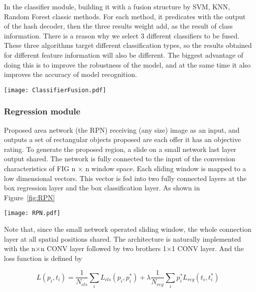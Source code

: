 In the classifier module, building it with
a fusion structure by SVM, KNN, Random
Forest classic methods. For each method, it 
predicates with the output of the hash decoder,
then the three results weight add, as the 
result of class information. There is a reason
why we select 3 different classifiers to be 
fused. These three algorithms target 
different classification types, so the 
results obtained for different feature 
information will also be different. The 
biggest advantage of doing this is to 
improve the robustness of the model, 
and at the same time it also improves 
the accuracy of model recognition. 

\begin{figure*}[!ht]
    \centering
    \texttt{[image: ClassifierFusion.pdf]}
    \caption{The module of the fusion of 
        classifier.}
    \label{fig:classifierFusion}
\end{figure*}   

\subsubsection{Regression module}
\label{sec:MethNetReg}

Proposed area network (the RPN) receiving 
(any size) image as an input, and outputs a 
set of rectangular objects proposed are each 
offer it has an objective rating.
To generate the proposed region, a slide on 
a small network last layer output shared.
The network is fully connected to the input 
of the conversion characteristics of FIG 
n × n window space.
Each sliding window is mapped to a low 
dimensional vectors.
This vector is fed into two fully connected 
layers at the box regression 
layer and the box classification layer.
As shown in Figure~\ref{fig:RPN}

\begin{figure*}[!ht]
    \centering
    \texttt{[image: RPN.pdf]}
    \caption{The module of the region proposal 
        network.}
    \label{fig:RPN}
\end{figure*} 


Note that, since the small network operated 
sliding window, the whole connection layer at 
all spatial positions shared. 
The architecture is naturally implemented with 
the n×n CONV layer followed by two brothers 
1×1 CONV layer\cite{Ren2017}.
And the loss function is defined by

\begin{equation}
    \label{eq:eq_descr_4}
    L({p_i},{t_i})=\frac{1}{N_{cls}}\sum_iL_{cls}(p_i,p_i^*)
     + \lambda\frac{1}{N_{reg}}\sum_ip_i^*L_{reg}(t_i,t_i^*)
\end{equation}

